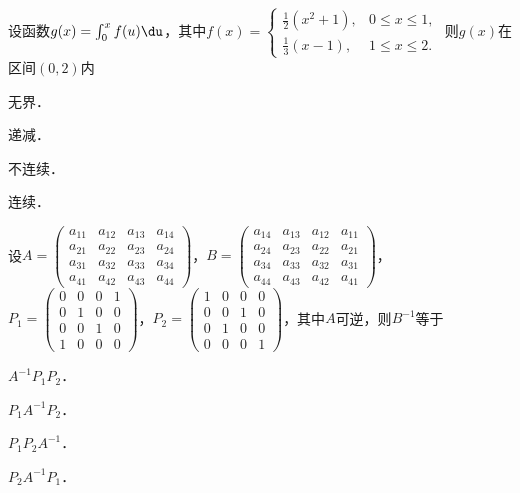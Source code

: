 \documentclass[plain,noanswer,medmath]{../../template/jnuexam}
\begin{document}
\begin{problem}
设函数$g(x) = \int_0^x f(u)\du$，其中$f(x) = \begin{cases}
  \frac{1}{2}(x^2 + 1), & 0 \le x \le 1, \\
    \frac{1}{3}(x - 1), & 1 \le x \le 2.
\end{cases}$ 则$g(x)$在区间$(0,2)$内\pickout{}
\begin{abcd}
\item 无界．
\item 递减．
\item 不连续．
\item 连续．
\end{abcd}
\end{problem}


\begin{problem}
设$A = \begin{pmatrix}
  a_{11} & a_{12} & a_{13} & a_{14} \\
  a_{21} & a_{22} & a_{23} & a_{24} \\
  a_{31} & a_{32} & a_{33} & a_{34} \\
  a_{41} & a_{42} & a_{43} & a_{44}
\end{pmatrix}$，$B = \begin{pmatrix}
  a_{14} & a_{13} & a_{12} & a_{11} \\
  a_{24} & a_{23} & a_{22} & a_{21} \\
  a_{34} & a_{33} & a_{32} & a_{31} \\
  a_{44} & a_{43} & a_{42} & a_{41}
\end{pmatrix}$，$P_1 = \begin{pmatrix}
  0 & 0 & 0 & 1 \\
  0 & 1 & 0 & 0 \\
  0 & 0 & 1 & 0 \\
  1 & 0 & 0 & 0
\end{pmatrix}$，\goodbreak $P_2 = \begin{pmatrix}
  1 & 0 & 0 & 0 \\
  0 & 0 & 1 & 0 \\
  0 & 1 & 0 & 0 \\
  0 & 0 & 0 & 1
\end{pmatrix}$，其中$A$可逆，则$B^{-1}$等于\pickout{}
\begin{abcd}
\item $A^{-1}P_1P_2$．
\item $P_1A^{-1}P_2$．
\item $P_1P_2A^{-1}$．
\item $P_2A^{-1}P_1$．
\end{abcd}
\end{problem}
\end{document}
